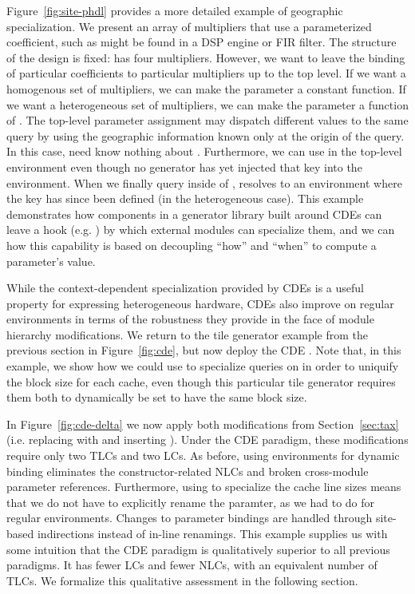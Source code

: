 Figure~\ref{fig:site-phdl} provides a more detailed example of geographic specialization.
We present an array of multipliers that use a parameterized coefficient, such as might be found in a DSP engine or FIR filter.
The structure of the design is fixed:  has four multipliers.
However, we want to leave the binding of particular coefficients to particular multipliers up to the top level.
If we want a homogenous set of multipliers, we can make the  parameter a constant function.
If we want a heterogeneous set of multipliers, we can make the  parameter a function of .
The top-level parameter assignment may dispatch different values to the same query by using the geographic information known only at the origin of the query. 
In this case,  need know nothing about .
Furthermore, we can use  in the top-level environment even though no generator has yet injected that key into the environment.
When we finally query  inside of ,  resolves to an environment where the  key has since been defined (in the heterogeneous case).
This example demonstrates how components in a generator library built around CDEs can leave a hook (e.g. ) by which external modules can specialize them,
and we can how this capability is based on decoupling ``how'' and ``when'' to compute a parameter's value. 

While the context-dependent specialization provided by CDEs is a useful property for expressing heterogeneous hardware,
CDEs also improve on regular environments in terms of the robustness they provide in the face of module hierarchy modifications.
We return to the tile generator example from the previous section in Figure~\ref{fig:cde}, but now deploy the CDE .
Note that, in this example, we show how we could use
 to specialize queries on  in order to uniquify the block size for each cache,
even though this particular tile generator requires them both to dynamically be set to have the same block size.

In Figure~\ref{fig:cde-delta} we now apply both modifications from Section~\ref{sec:tax} (i.e. replacing  with  and inserting ).
Under the CDE paradigm, these modifications require only two TLCs and two LCs.
As before, using environments for dynamic binding eliminates the constructor-related NLCs and broken cross-module parameter references.
Furthermore, using  to specialize the cache line sizes means that we do not have to explicitly rename the  paramter, as we had to do for regular environments.
Changes to parameter bindings are handled through site-based indirections instead of in-line renamings.
This example supplies us with some intuition that the CDE paradigm is qualitatively superior to all previous paradigms.
It has fewer LCs and fewer NLCs, with an equivalent number of TLCs.
We formalize this qualitative assessment in the following section.

